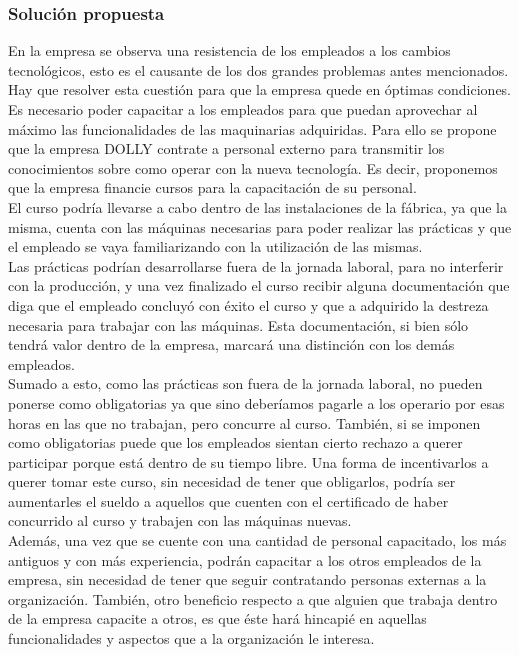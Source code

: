 \documentclass[a4paper,10pt,titlepage]{article}
\begin{document}
\subsubsection{Soluci\'on propuesta}
		\indent En la empresa se observa una resistencia de los empleados a los cambios tecnol\'ogicos, esto es el causante de los dos grandes problemas antes mencionados. Hay que resolver esta cuesti\'on para que la empresa quede en \'optimas condiciones.\\
		\indent Es necesario poder capacitar a los empleados para que puedan aprovechar al máximo las funcionalidades de las maquinarias adquiridas. Para ello se propone que la empresa DOLLY contrate a personal externo para transmitir los conocimientos sobre como operar con la nueva tecnología. Es decir, proponemos que la empresa financie cursos para la capacitación de su personal. \\
		\indent El curso podría llevarse a cabo dentro de las instalaciones de la fábrica, ya que la misma, cuenta con las máquinas necesarias para poder realizar las prácticas y que el empleado se vaya familiarizando con la utilización de las mismas.\\
		\indent Las prácticas podrían desarrollarse fuera de la jornada laboral, para no interferir con la producción, y una vez finalizado el curso recibir alguna documentación que diga que el empleado concluyó con éxito el curso y que a adquirido la destreza necesaria para trabajar con las máquinas. Esta documentación, si bien sólo tendrá valor dentro de la empresa, marcará una distinción con los demás empleados.\\
		\indent Sumado a esto, como las prácticas son fuera de la jornada laboral, no pueden ponerse como obligatorias ya que sino deberíamos pagarle a los operario por esas  horas en las que no trabajan, pero concurre al curso. También, si se imponen como obligatorias puede que los empleados sientan cierto rechazo a  querer participar porque está dentro de su tiempo libre. Una forma de incentivarlos a querer tomar este curso, sin necesidad de tener que obligarlos, podría ser aumentarles el sueldo a aquellos que cuenten con el certificado de haber concurrido al curso y trabajen con las máquinas nuevas.\\
		\indent Además, una vez que se cuente con una cantidad de personal capacitado, los más antiguos y con más experiencia, podrán capacitar a los otros empleados de la empresa, sin necesidad de tener que seguir contratando personas externas a la organización. También, otro beneficio respecto a que alguien que trabaja dentro de la empresa capacite a otros, es que éste hará hincapié en aquellas funcionalidades y aspectos que a la organización le interesa. \\
\end{document}
